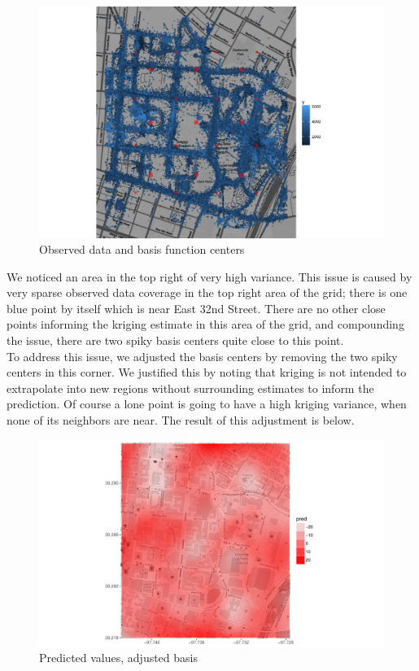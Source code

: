 \documentclass[11pt]{article}
\begin{document}
\begin{figure}[h!]
\centering
\includegraphics[width=160mm,keepaspectratio]{Images/data_grid.png}
\caption{Observed data and basis function centers \label{fig:6}}
\end{figure}

We noticed an area in the top right of very high variance.  This issue is caused by very sparse observed data coverage in the top right area of the grid; there is one blue point by itself which is near East 32nd Street.  There are no other close points informing the kriging estimate in this area of the grid, and compounding the issue, there are two spiky basis centers quite close to this point. \\

To address this issue, we adjusted the basis centers by removing the two spiky centers in this corner.  We justified this by noting that kriging is not intended to extrapolate into new regions without surrounding estimates to inform the prediction.  Of course a lone point is going to have a high kriging variance, when none of its neighbors are near. The result of this adjustment is below. \\

\begin{figure}[h!]
\centering
\includegraphics[width=160mm,keepaspectratio]{Images/pred_newgrid.pdf}
\caption{Predicted values, adjusted basis \label{fig:7}}
\end{figure}
\end{document}
